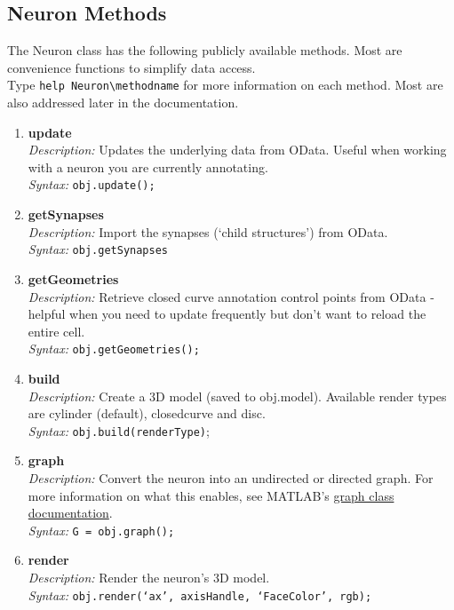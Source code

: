 \documentclass[12pt]{exam}
\begin{document}
	\subsection{Neuron Methods}
	The Neuron class has the following publicly available methods. Most are convenience functions to simplify data access.\\ Type \verb|help Neuron\methodname| for more information on each method. Most are also addressed later in the documentation.
	\begin{enumerate}
		\item \textbf{update}\\
		\textit{Description:} Updates the underlying data from OData. Useful when working with a neuron you are currently annotating.\\
		\textit{Syntax:} \texttt{obj.update();}
		\item \textbf{getSynapses}\\
		\textit{Description:} Import the synapses (`child structures') from OData.\\
		\textit{Syntax:} \texttt{obj.getSynapses}
		\item \textbf{getGeometries}\\
		\textit{Description:} Retrieve closed curve annotation control points from OData - helpful when you need to update frequently but don't want to reload the entire cell.\\
		\textit{Syntax:} \texttt{obj.getGeometries();}
		\item \textbf{build}\\
		\textit{Description:} Create a 3D model (saved to obj.model). Available render types are cylinder (default), closedcurve and disc.\\
		\textit{Syntax:} \texttt{obj.build(renderType)};
		\item \textbf{graph}\\
		\textit{Description:} Convert the neuron into an undirected or directed graph. For more information on what this enables, see MATLAB's \href{https://www.mathworks.com/help/matlab/graph-and-network-algorithms.html}{graph class documentation}.\\
		\textit{Syntax:} \texttt{G = obj.graph();}
		\item \textbf{render}\\
		\textit{Description:} Render the neuron's 3D model.\\
		\textit{Syntax:} \texttt{obj.render(`ax', axisHandle, `FaceColor', rgb);}

\end{enumerate}
\end{document}
